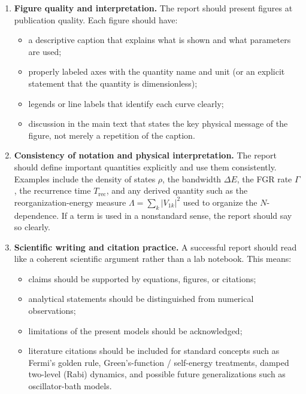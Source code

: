 \documentclass[12pt,letterpaper]{article}
\begin{document}
\begin{enumerate}
\item \textbf{Figure quality and interpretation.}
  The report should present figures at publication quality.  Each figure
  should have:
  \begin{itemize}
    \item a descriptive caption that explains what is shown and what
          parameters are used;
    \item properly labeled axes with the quantity name and unit (or an
          explicit statement that the quantity is dimensionless);
    \item legends or line labels that identify each curve clearly;
    \item discussion in the main text that states the key physical message of
          the figure, not merely a repetition of the caption.
  \end{itemize}

\item \textbf{Consistency of notation and physical interpretation.}
  The report should define important quantities explicitly and use them
  consistently.  Examples include the density of states $\rho$, the bandwidth
  $\Delta E$, the FGR rate $\Gamma$, the recurrence time $T_\mathrm{rec}$,
  and any derived quantity such as the reorganization-energy measure
  $\Lambda = \sum_k |V_{1k}|^2$ used to organize the $N$-dependence.  If a
  term is used in a nonstandard sense, the report should say so clearly.

\item \textbf{Scientific writing and citation practice.}
  A successful report should read like a coherent scientific argument rather
  than a lab notebook.  This means:
  \begin{itemize}
    \item claims should be supported by equations, figures, or citations;
    \item analytical statements should be distinguished from numerical
          observations;
    \item limitations of the present models should be acknowledged;
    \item literature citations should be included for standard concepts such
          as Fermi's golden rule, Green's-function / self-energy treatments,
          damped two-level (Rabi) dynamics, and possible future generalizations
          such as oscillator-bath models.
  \end{itemize}

\end{enumerate}
\end{document}
